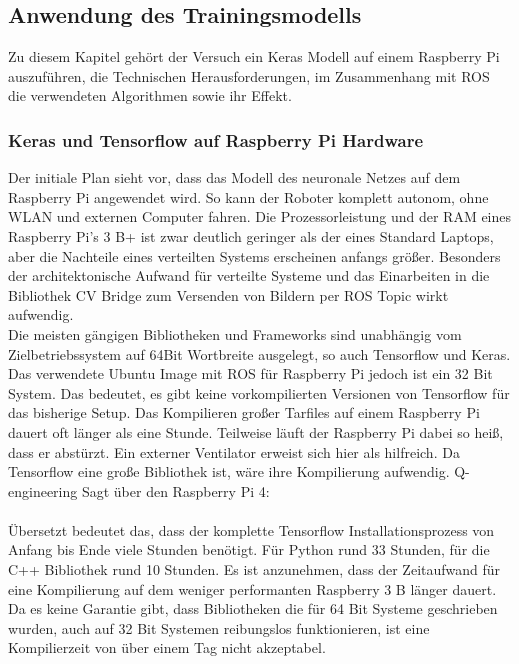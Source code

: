 \documentclass[conference]{IEEEtran}
\begin{document}
	
	\subsection{Anwendung des Trainingsmodells} %
	Zu diesem Kapitel gehört der Versuch ein Keras Modell auf einem 
	Raspberry Pi auszuführen, die Technischen Herausforderungen, im 
	Zusammenhang mit ROS  die verwendeten Algorithmen sowie ihr Effekt. 
	
	\subsubsection{Keras und Tensorflow auf Raspberry Pi Hardware}
	Der initiale Plan sieht vor, dass das Modell des neuronale Netzes auf dem 
	Raspberry Pi 
	angewendet wird. So kann der Roboter komplett autonom, ohne WLAN 
	und externen Computer fahren. Die Prozessorleistung und der RAM 
	eines Raspberry Pi's 3 B+ ist zwar deutlich geringer als der eines 
	Standard Laptops, aber die Nachteile eines verteilten Systems erscheinen 
	anfangs größer. Besonders der architektonische Aufwand für verteilte 
	Systeme und das Einarbeiten in die Bibliothek CV Bridge zum Versenden 
	von Bildern per ROS Topic wirkt aufwendig. \\
	Die meisten gängigen Bibliotheken und Frameworks sind unabhängig vom 
	Zielbetriebssystem auf 64Bit Wortbreite ausgelegt, so auch Tensorflow 
	und Keras. Das verwendete Ubuntu Image mit ROS für Raspberry Pi 
	jedoch ist ein 32 Bit System. Das bedeutet, es gibt keine vorkompilierten 
	Versionen von Tensorflow für das bisherige Setup. Das Kompilieren 
	großer Tarfiles auf einem Raspberry Pi dauert oft länger als eine Stunde. 
	Teilweise läuft der Raspberry Pi dabei so heiß, dass er abstürzt. Ein 
	externer Ventilator erweist sich hier als hilfreich. Da Tensorflow eine große 
	Bibliothek ist, wäre ihre Kompilierung aufwendig.
Q-engineering	\cite{qengineering}
	Sagt über den Raspberry Pi 4: \\
	 \\
	Übersetzt bedeutet das, dass der komplette Tensorflow Installationsprozess von Anfang bis Ende viele Stunden benötigt. Für Python rund 33 Stunden, für die C++ 
	Bibliothek rund 10 Stunden.
	Es ist anzunehmen, dass der Zeitaufwand für eine Kompilierung auf dem 
	weniger performanten Raspberry 3 B länger dauert. Da es keine Garantie 
	gibt, dass Bibliotheken die für 64 Bit Systeme geschrieben wurden, auch 
	auf 32 Bit Systemen reibungslos funktionieren, ist eine Kompilierzeit 
	von über einem Tag nicht akzeptabel. \\
	
\end{document}

